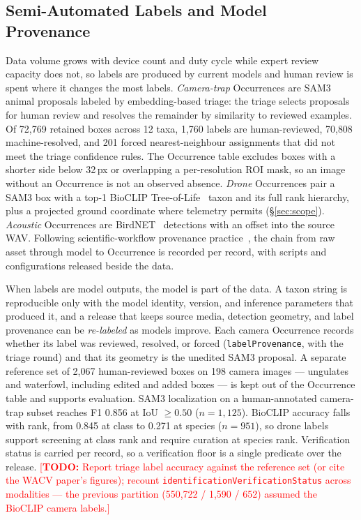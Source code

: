\documentclass[sigconf]{acmart}
\newcommand{\TODO}[1]{\textcolor{red}{\footnotesize[\textbf{TODO:} #1]}}
\newcommand{\TODO}[1]{}
\begin{document}
\subsection{Semi-Automated Labels and Model Provenance}
\label{sec:provenance}
\label{sec:modelprov}

Data volume grows with device count and duty cycle while expert review
capacity does not, so labels are produced by current models and human
review is spent where it changes the most labels.
\emph{Camera-trap} Occurrences are SAM3~\cite{carion2026sam} animal
proposals labeled by embedding-based triage: the triage selects
proposals for human review and resolves the remainder by similarity to
reviewed examples. Of 72{,}769 retained boxes across 12 taxa, 1{,}760
labels are human-reviewed, 70{,}808 machine-resolved, and 201 forced
nearest-neighbour assignments that did not meet the triage confidence
rules. The Occurrence table excludes boxes with a shorter side below
32\,px or overlapping a per-resolution ROI mask, so an image without an
Occurrence is not an observed absence. \emph{Drone} Occurrences pair a
SAM3 box with a top-1 BioCLIP
Tree-of-Life~\cite{stevens2024bioclip,gu2025bioclip,treeoflife_200m}
taxon and its full rank hierarchy, plus a projected ground coordinate
where telemetry permits (\S\ref{sec:scope}). \emph{Acoustic}
Occurrences are BirdNET~\cite{kahl2021birdnet} detections with an
offset into the source WAV. Following scientific-workflow provenance
practice~\cite{simmhan2005provenance}, the chain from raw asset through
model to Occurrence is recorded per record, with scripts and
configurations released beside the data.

When labels are model outputs, the model is part of the data. A taxon
string is reproducible only with the model identity, version, and
inference parameters that produced it, and a release that keeps source
media, detection geometry, and label provenance can be
\emph{re-labeled} as models improve. Each camera Occurrence records
whether its label was reviewed, resolved, or forced
(\texttt{labelProvenance}, with the triage round) and that its geometry
is the unedited SAM3 proposal. A separate reference set of 2{,}067
human-reviewed boxes on 198 camera images --- ungulates and waterfowl,
including edited and added boxes --- is kept out of the Occurrence
table and supports evaluation. SAM3 localization on a human-annotated
camera-trap subset reaches F1 0.856 at IoU $\geq 0.50$ ($n{=}1{,}125$).
BioCLIP accuracy falls with rank, from 0.845 at class to 0.271 at
species ($n{=}951$), so drone labels support screening at class rank and
require curation at species rank. Verification status is carried per
record, so a verification floor is a single predicate over the release.
\TODO{Report triage label accuracy against the reference set (or cite
the WACV paper's figures); recount
\texttt{identificationVerificationStatus} across modalities --- the
previous partition (550{,}722 / 1{,}590 / 652) assumed the BioCLIP
camera labels.}
\end{document}
